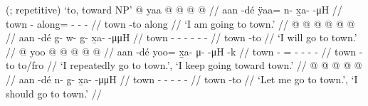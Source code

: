 \documentclass[12pt,letterpaper,oneside,article]{memoir}
\begin{document}
\pex\label{ex:motderiv-overlap-de-n}%
\a\label{ex:motderiv-overlap-de-n-motderiv}%
%
	 (;  repetitive) ‘to, toward NP’
\a\label{ex:motderiv-overlap-de-n-prog}%
%
\begingl
	\gla	{} @ {} yaa @  @ {} @ {} @ {} //
	\glb	aan -dé ÿaa= n- x̱a-  -μH //
	\glc	town - along= - -  - //
	\gld	town -to along\•  {} {} {} //
	\glft	‘I am going to town.’
		//
\endgl
\a\label{ex:motderiv-overlap-de-n-prosp}%
%
\begingl
	\gla	{} @ {}  @ {} @ {} @ {} @ {} @ {} //
	\glb	aan -dé g- w- g̱- x̱a-  -μμH //
	\glc	town - - - - -  - //
	\gld	town -to  {} {} {} {} {} //
	\glft	‘I will go to town.’
		//
\endgl
\a\label{ex:motderiv-overlap-de-n-repimpfv}%
%
\begingl
	\gla	{} @ {} yoo @  @ {} @ {} @ {} @ {} //
	\glb	aan -dé yoo= x̱a- μ-  -μH -k //
	\glc	town - = - -  - - //
	\gld	town -to to/fro\·  {} {} {} {} //
	\glft	‘I repeatedly go to town.’, ‘I keep going toward town.’
		//
\endgl
\a\label{ex:motderiv-overlap-de-n-hort}%
%
\begingl
	\gla	{} @ {}  @ {} @ {} @ {} @ {} //
	\glb	aan -dé n- g̱- x̱a-  -μμH //
	\glc	town - - - -  - //
	\gld	town -to  {} {} {} {} //
	\glft	‘Let me go to town.’, ‘I should go to town.’
		//
\endgl
\xe
\end{document}
